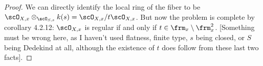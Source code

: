 \begin{proof}
	We can directly identify the local ring of the fiber to be $\scO_{X,x} \otimes_{\scO_{S,s}} k(s) = \scO_{X,x}/t\scO_{X,x}$. But now the problem is complete by corollary 4.2.12: $\scO_{X,x}$ is regular if and only if $t \in \frm_x \setminus \frm_x^2$. [Something must be wrong here, as I haven't used flatness, finite type, $s$ being closed, or $S$ being Dedekind at all, although the existence of $t$ does follow from these last two facts].
\end{proof}
